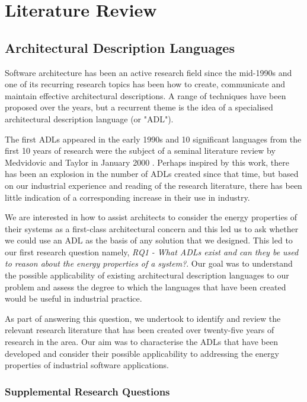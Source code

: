 \chapter{Literature Review} \label{chapter:lit-review}

\section{Architectural Description Languages} \label{sec:adl-lit-review}

Software architecture has been an active research field since the mid-1990s and one of its recurring research topics has been how to create, communicate and maintain effective architectural descriptions.  A range of techniques have been proposed over the years, but a recurrent theme is the idea of a specialised architectural description language (or "ADL").

The first ADLs appeared in the early 1990s and 10 significant languages from the first 10 years of research were the subject of a seminal literature review by Medvidovic and Taylor in January 2000 \cite{medvidovic2000-adlcomparison}.  Perhaps inspired by this work, there has been an explosion in the number of ADLs created since that time, but based on our industrial experience and reading of the research literature, there has been little indication of a corresponding increase in their use in industry.  

We are interested in how to assist architects to consider the energy properties of their systems as a first-class architectural concern and this led us to ask whether we could use an ADL as the basis of any solution that we designed.   This led to our first research question namely, \emph{RQ1 - What ADLs exist and can they be used to reason about the energy properties of a system?}.  Our goal was to understand the possible applicability of existing architectural description languages to our problem and assess the degree to which the languages that have been created would be useful in industrial practice.

As part of answering this question, we undertook to identify and review the relevant research literature that has been created over twenty-five years of research in the area.  Our aim was to characterise the ADLs that have been developed and consider their possible applicability to addressing the energy properties of industrial software applications.

\subsection{Supplemental Research Questions}

